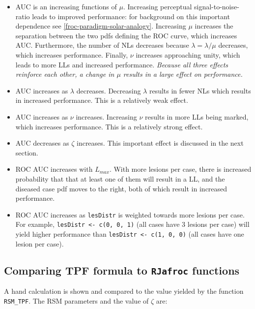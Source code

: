 \documentclass[
]{book}
\begin{document}
\begin{itemize}
\item
  AUC is an increasing functions of \(\mu\). Increasing perceptual signal-to-noise-ratio leads to improved performance: for background on this important dependence see \ref{froc-paradigm-solar-analogy}. Increasing \(\mu\) increases the separation between the two pdfs defining the ROC curve, which increases AUC. Furthermore, the number of NLs decreases because \(\lambda = \lambda / \mu\) decreases, which increases performance. Finally, \(\nu\) increases approaching unity, which leads to more LLs and increased performance. \emph{Because all three effects reinforce each other, a change in \(\mu\) results in a large effect on performance.}
\item
  AUC increases as \(\lambda\) decreases. Decreasing \(\lambda\) results in fewer NLs which results in increased performance. This is a relatively weak effect.
\item
  AUC increases as \(\nu\) increases. Increasing \(\nu\) results in more LLs being marked, which increases performance. This is a relatively strong effect.
\item
  AUC decreases as \(\zeta\) increases. This important effect is discussed in the next section.
\item
  ROC AUC increases with \(L_{max}\). With more lesions per case, there is increased probability that that at least one of them will result in a LL, and the diseased case pdf moves to the right, both of which result in increased performance.
\item
  ROC AUC increases as \texttt{lesDistr} is weighted towards more lesions per case. For example, \texttt{lesDistr\ \textless{}-\ c(0,\ 0,\ 1)} (all cases have 3 lesions per case) will yield higher performance than \texttt{lesDistr\ \textless{}-\ c(1,\ 0,\ 0)} (all cases have one lesion per case).
\end{itemize}

\hypertarget{comparing-tpf-formula-to-rjafroc-functions}{%
\subsection{\texorpdfstring{Comparing TPF formula to \texttt{RJafroc} functions}{Comparing TPF formula to RJafroc functions}}\label{comparing-tpf-formula-to-rjafroc-functions}}

A hand calculation is shown and compared to the value yielded by the function \texttt{RSM\_TPF}. The RSM parameters and the value of \(\zeta\) are:
\end{document}
